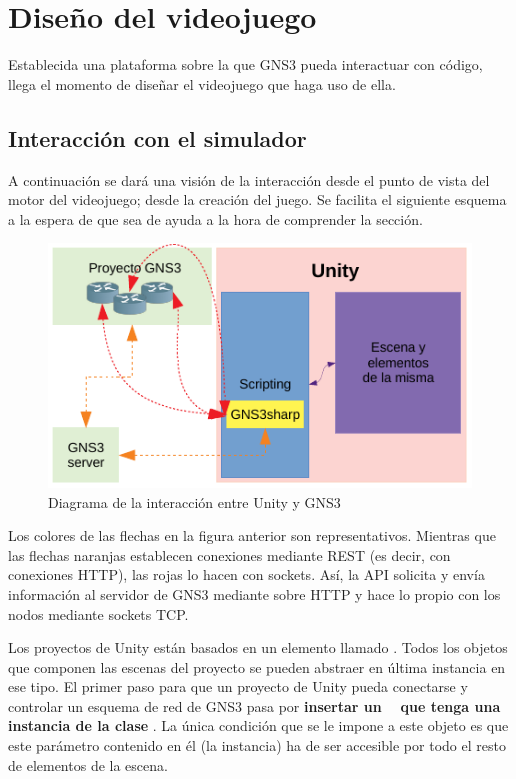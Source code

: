 \section{Diseño del videojuego}
Establecida una plataforma sobre la que GNS3 pueda interactuar con código, llega el momento de diseñar el videojuego que haga uso de ella. 

\subsection{Interacción con el simulador}\label{subsec:interac_emul}
A continuación se dará una visión de la interacción desde el punto de vista del motor del videojuego; desde la creación del juego. Se facilita el siguiente esquema a la espera de que sea de ayuda a la hora de comprender la sección.

\begin{figure}[H]
  \centering
  \includegraphics[scale=1.4]{imagenes/diagrama_interaccion}
  \caption{Diagrama de la interacción entre Unity y GNS3}
  \label{fig:diagrama_interaccion}
\end{figure}

Los colores de las flechas en la figura anterior son representativos. Mientras que las flechas naranjas establecen conexiones mediante REST (es decir, con conexiones HTTP), las rojas lo hacen con sockets. Así, la API solicita y envía información al servidor de GNS3 mediante sobre HTTP y hace lo propio con los nodos mediante sockets TCP.

Los proyectos de Unity están basados en un elemento llamado \GAOBJ. Todos los objetos que componen las escenas del proyecto se pueden abstraer en última instancia en ese tipo. El primer paso para que un proyecto de Unity pueda conectarse y controlar un esquema de red de GNS3 pasa por \textbf{insertar un \GAOBJ~ que tenga una instancia de la clase \GNSCS}. La única condición que se le impone a este objeto es que este parámetro contenido en él (la instancia) ha de ser accesible por todo el resto de elementos de la escena.


